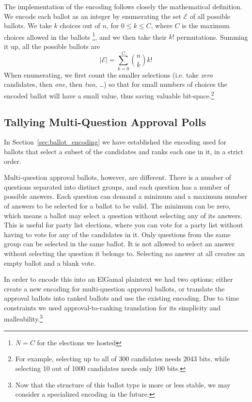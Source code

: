 \documentclass[letterpaper,10pt]{article}
\begin{document}
The implementation of the encoding follows closely the mathematical
definition. We encode each ballot as an integer by enumerating the set
$\mathcal{E}$ of all possible ballots. We take $k$ choices out of $n$,
for $0\leq k \leq C$, where $C$ is the maximum choices allowed in the
ballots \footnote{$N=C$ for the elections we hosted}, and we then take
their $k!$ permutations. Summing it up, all the possible ballots are
\begin{equation}
\label{eq:max_encoded}
|\mathcal{E}| = \sum^{C}_{k=0}\binom{n}{k}k!
\end{equation}
When enumerating, we first count the smaller selections (i.e. take
\textit{zero} candidates, then \textit{one}, then \textit{two},
\ldots) so that for small numbers of choices the encoded ballot will
have a small value, thus saving valuable bit-space.\footnote{ For
  example, selecting up to all of 300 candidates needs 2043 bits,
  while selecting 10 out of 1000 candidates needs only 100 bits.}


\subsection{Tallying Multi-Question Approval Polls}
\label{sec:approval_counting}
In Section~\ref{sec:ballot_encoding} we have established the encoding
used for ballots that select a subset of the candidates and ranks each
one in it, in a strict order.

Multi-question approval ballots, however, are different.
There is a number of questions separated into distinct groups,
and each question has a number of possible answers.
Each question can demand a minimum and a maximum number of answers
to be selected for a ballot to be valid.
The minimum can be zero, which means a ballot may select a question
without selecting any of its answers.
This is useful for party list elections, where you can vote for
a party list without having to vote for any of the candidates in it.
Only questions from the same group can be selected in the same ballot.
It is not allowed to select an answer without selecting the question
it belongs to.
Selecting no answer at all creates an empty ballot and a blank vote.

In order to encode this into an ElGamal plaintext we had two options;
either create a new encoding for multi-question approval ballots,
or translate the approval ballots into ranked ballots and use the
existing encoding.
Due to time constraints we used approval-to-ranking translation for
its simplicity and malleability.\footnote{Now that the structure of
  this ballot type is more or less stable, we may consider a
  specialized encoding in the future.}
\end{document}
